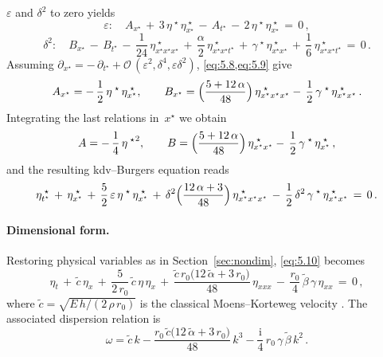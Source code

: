 \documentclass[alpha-refs, 12pt]{wiley-article}
\renewcommand{\O}{\mathcal{O}}
\newcommand{\ui}{\mathrm{i}}
\newcommand{\eps}{\varepsilon}
\begin{document}
$\eps$ and $\delta^{2}$ to zero yields
\begin{equation}\label{eq:5.8}
  \eps:\quad
  A_{x^{\star}}\,+\,3\,\eta^{\;\star}\,\eta^{\;\star}_{x^{\star}}\,-\,A_{t^{\star}}\,-\,2\,\eta^{\;\star}\,\eta^{\;\star}_{x^{\star}}\,=\,0\,,
\end{equation}
\begin{equation}\label{eq:5.9}
  \delta^{2}:\quad
  B_{x^{\star}}\,-\,B_{t^{\star}}\,-\,\frac{1}{24}\,\eta^{\;\star}_{x^{\star}x^{\star}x^{\star}}\,+\,\frac{\alpha}{2}\,
  \eta^{\;\star}_{x^{\star}x^{\star}t^{\star}}
  \,+\,\gamma^{\;\star}\,\eta^{\;\star}_{x^{\star}x^{\star}}\,+\,\frac{1}{6}\,\eta^{\;\star}_{x^{\star}x^{\star}t^{\star}}\,=\,0\,.
\end{equation}
Assuming $\partial_{x^{\star}} = -\,\partial_{t^{\star}} + \O\,(\eps^{2},\delta^{4},\eps\delta^{2})$, \cref{eq:5.8,eq:5.9} give
\begin{equation*}
  A_{x^{\star}}=-\,\frac{1}{2}\,\eta^{\;\star}\,\eta^{\;\star}_{x^{\star}}, \qquad
  B_{x^{\star}}=\Bigl(\frac{5+12\,\alpha}{48}\Bigr)\,\eta^{\;\star}_{x^{\star}x^{\star}x^{\star}}
  -\,\frac{1}{2}\,\gamma^{\;\star}\,\eta^{\;\star}_{x^{\star}x^{\star}}\,.
\end{equation*}
Integrating the last relations in~$x^{\star}$ we obtain
\begin{equation*}
  A=-\,\frac{1}{4}\,{\eta^{\;\star}}^{2},\qquad
  B=\Bigl(\frac{5+12\,\alpha}{48}\Bigr)\,\eta^{\;\star}_{x^{\star}x^{\star}}
  -\,\frac{1}{2}\,\gamma^{\;\star}\,\eta^{\;\star}_{x^{\star}}\,,
\end{equation*}
and the resulting \acrshort{kdv}--Burgers equation reads
\begin{equation}\label{eq:5.10}
  \eta^{\;\star}_{t^{\star}}\,+\,\eta^{\;\star}_{x^{\star}}
  \,+\,\frac{5}{2}\,\eps\,\eta^{\;\star}\,\eta^{\;\star}_{x^{\star}}
  \,+\,\delta^{2}\Bigl(\frac{12\,\alpha+3}{48}\Bigr)\,\eta^{\;\star}_{x^{\star}x^{\star}x^{\star}}
  \,-\,\frac{1}{2}\,\delta^{2}\,\gamma^{\;\star}\,\eta^{\;\star}_{x^{\star}x^{\star}}\,=\,0\,.
\end{equation}

\paragraph{Dimensional form.} Restoring physical variables as in Section~\ref{sec:nondim}, \cref{eq:5.10} becomes
\begin{equation}\label{eq:KdVdim}
  \eta_{t}\,+\,\tilde{c}\,\eta_{x}\,+\,\frac{5}{2\,r_{0}}\,\tilde{c}\,\eta\,\eta_{x}\, + \,\frac{\tilde{c}\,r_{0}\bigl(12\,\tilde{\alpha}+3\,r_{0}\bigr)}{48}\,\eta_{xxx}\, - \,\frac{r_{0}}{4}\,\tilde{\beta}\,\gamma\,\eta_{xx}\,=\,0\,,
\end{equation}
where $\tilde{c}=\sqrt{E\,h/(2\,\rho\,r_{0})}$ is the classical Moens--Korteweg velocity
\cite{Fung1997a}. The associated dispersion relation is
\begin{equation*}
  \omega=\tilde{c}\,k - \frac{r_{0}\,\tilde{c}\bigl(12\,\tilde{\alpha}+3\,r_{0}\bigr)}{48}\,k^{3} - \frac{\ui}{4}\,r_{0}\,\gamma\,\tilde{\beta}\,k^{2}\,.
\end{equation*}
\end{document}
